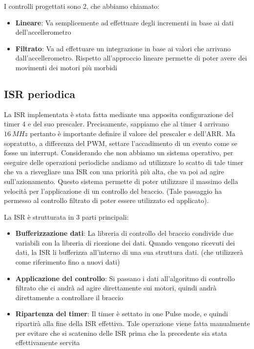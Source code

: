 I controlli progettati sono 2, che abbiamo chiamato:
\begin{itemize}
	\item \textbf{Lineare}: Va semplicemente ad effettuare degli incrementi in base ai dati dell'accellerometro
	\item \textbf{Filtrato}: Va ad effettuare un integrazione in base ai valori che arrivano dall'accellerometro. Rispetto all'approccio lineare permette di poter avere dei movimenti dei motori più morbidi
\end{itemize}

\subsection{ISR periodica}
La ISR implementata è stata fatta mediante una apposita configurazione del timer 4 e del suo prescaler. Precisamente, sappiamo che al timer 4 arrivano \(16\ MHz\) pertanto è importante definire il valore del prescaler e dell'ARR. Ma sopratutto, a differenza del PWM, settare l'accadimento di un evento come se fosse un interrupt. Considerando che non abbiamo un sistema operativo, per eseguire delle operazioni periodiche andiamo ad utilizzare lo scatto di tale timer che va a risvegliare una ISR con una priorità più alta, che va poi ad agire sull'azionamento.
Questo sistema permette di poter utilizzare il massimo della velocità per l'applicazione di un controllo del braccio. (Tale passaggio ha permesso al controllo filtrato di poter essere utilizzato ed applicato).

La ISR è strutturata in 3 parti principali:
\begin{itemize}
	\item \textbf{Bufferizzazione dati}: La libreria di controllo del braccio condivide due variabili con la libreria di ricezione dei dati. Quando vengono ricevuti dei dati, la ISR li bufferizza all'interno di una sua struttura dati. (che utilizzerà come riferimento fino a nuovi dati)
	\item \textbf{Applicazione del controllo}: Si passano i dati all'algoritmo di controllo filtrato che ci andrà ad agire direttamente sui motori, quindi andrà direttamente a controllare il braccio
	\item \textbf{Ripartenza del timer}: Il timer è settato in one Pulse mode, e quindi ripartirà alla fine della ISR effettiva. Tale operazione viene fatta manualmente per evitare che si scatenino delle ISR prima che la precedente sia stata effettivamente servita
\end{itemize}

